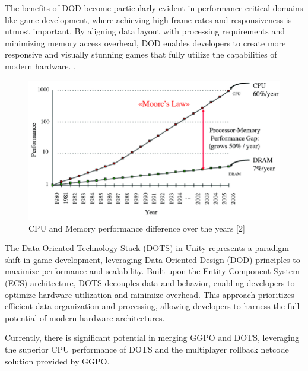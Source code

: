 The benefits of DOD become particularly evident in performance-critical domains like game development, where achieving high frame rates and responsiveness is utmost important. By aligning data layout with processing requirements and minimizing memory access overhead, DOD enables developers to create more responsive and visually stunning games that fully utilize the capabilities of modern hardware. \cite{DOD_in_games}, \cite{DOD_applications_in_games}\newline

\begin{figure}[h]
    \centering
    \includegraphics[scale=0.4]{images/CPUvsMEMORY.png}
    \caption{CPU and Memory performance difference over the years [2]}
    \label{fig:cpu-memory}
\end{figure}

The Data-Oriented Technology Stack (DOTS) in Unity represents a paradigm shift in game development, leveraging Data-Oriented Design (DOD) principles to maximize performance and scalability. Built upon the Entity-Component-System (ECS) architecture, DOTS decouples data and behavior, enabling developers to optimize hardware utilization and minimize overhead. This approach prioritizes efficient data organization and processing, allowing developers to harness the full potential of modern hardware architectures.\newline

Currently, there is significant potential in merging GGPO and DOTS, leveraging the superior CPU performance of DOTS and the multiplayer rollback netcode solution provided by GGPO.
